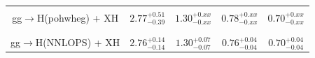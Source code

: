 \begin{table}[!h!tb]
\begin{center}
\begin{tabular}{|c|c|c|c|c|}
\\
\vspace{-0.4cm} &&&&\\
\hline %
\vspace{-0.4cm} &&&&\\
\small gg$\rightarrow$H({\sc pohwheg}) + XH
&$2.77^{+0.51}_{-0.39}$
&$1.30^{+0.xx}_{-0.xx}$
&$0.78^{+0.xx}_{-0.xx}$
&$0.70^{+0.xx}_{-0.xx}$
\\
\vspace{-0.4cm} &&&&\\
\hline %
\vspace{-0.4cm} &&&&\\
\small gg$\rightarrow$H({\sc NNLOPS}) + XH
&$2.76^{+0.14}_{-0.14}$
&$1.30^{+0.07}_{-0.07}$
&$0.76^{+0.04}_{-0.04}$
&$0.70^{+0.04}_{-0.04}$
\\
\hline %
\hline %
%
%

\end{tabular}
\end{center}
\end{table}
